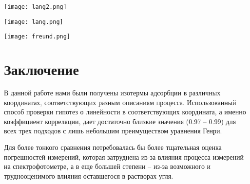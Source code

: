 \documentclass[a4paper]{article}
\begin{document}
\graphicspath{{./images/}}
		\begin{center}
		
			\texttt{[image: lang2.png]}
	

	\par
 \vspace{0.3cm}
 \end{center}
\vspace{0.3cm}
\par

\graphicspath{{./images/}}
		\begin{center}
		
			\texttt{[image: lang.png]}
	

	\par
 \vspace{0.3cm}
 \end{center}
\vspace{0.3cm}
\par

\graphicspath{{./images/}}
		\begin{center}
		
			\texttt{[image: freund.png]}
	

	\par
 \vspace{0.3cm}
 \end{center}
\vspace{0.3cm}
\par



\section{\LARGE \textbf{Заключение}}
\par \vspace{0.3 cm}

В данной работе нами были получены изотермы адсорбции в различных координатах, соответствующих разным описаниям процесса. Использованный способ проверки гипотез о линейности в соответствующих координата, а именно коэффициент корреляции, дает достаточно близкие значения (0.97 -- 0.99) для всех трех подходов с лишь небольшим преимуществом уравнения Генри. \par \vspace{0.3 cm} 
Для более тонкого сравнения потребовалась бы более тщательная оценка погрешностей измерений, которая затруднена из-за влияния процесса измерений на спектрофотометре, а в еще большей степени -- из-за возможного и труднооценимого влияния оставшегося в растворах угля. 
\end{document}
